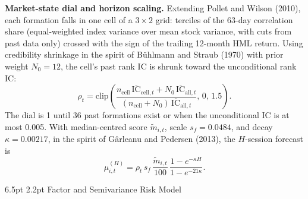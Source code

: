\documentclass[10pt,twocolumn,letterpaper]{article}
\makeatletter
\renewcommand{\section}{\@startsection{section}{1}{\z@}%
  {6.5pt \@plus 2pt \@minus 1pt}%
  {2.2pt}%
  {\normalfont\normalsize\bfseries}}
\makeatother
\begin{document}
\textbf{Market-state dial and horizon scaling.} Extending Pollet and Wilson (2010), each formation falls in one cell of a $3 \times 2$ grid: terciles of the 63-day correlation share (equal-weighted index variance over mean stock variance, with cuts from past data only) crossed with the sign of the trailing 12-month HML return. Using credibility shrinkage in the spirit of B\"uhlmann and Straub (1970) with prior weight $N_0 = 12$, the cell's past rank IC is shrunk toward the unconditional rank IC:
\begin{equation}
\rho_t = \mathrm{clip}\!\left(\frac{n_{\text{cell}}\,\overline{\mathrm{IC}}_{\text{cell},t} + N_0\,\overline{\mathrm{IC}}_{\text{all},t}}{(n_{\text{cell}} + N_0)\,\overline{\mathrm{IC}}_{\text{all},t}},\, 0,\, 1.5\right). \label{eq:rho_dial}
\end{equation}
The dial is 1 until 36 past formations exist or when the unconditional IC is at most 0.005. With median-centred score $\tilde{m}_{i,t}$, scale $s_f = 0.0484$, and decay $\kappa = 0.00217$, in the spirit of G\^arleanu and Pedersen (2013), the $H$-session forecast is
\begin{equation}
\mu_{i,t}^{(H)} = \rho_t\, s_f\, \frac{\tilde{m}_{i,t}}{100}\,\frac{1 - e^{-\kappa H}}{1 - e^{-21\kappa}}.
\end{equation}

\section{Factor and Semivariance Risk Model}
\end{document}
